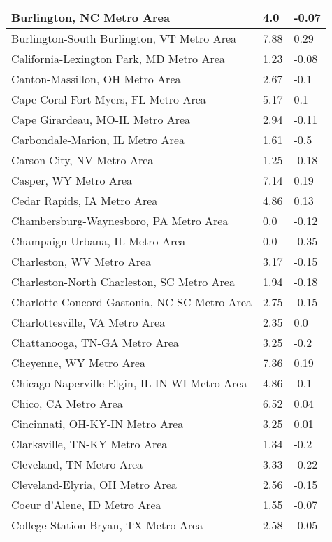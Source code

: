 \documentclass[12pt,oneside, letterpaper]{book}
\begin{document}
\begin{longtable}{| p{} | p{} | p{} |}
    Burlington, NC Metro Area & 4.0 & -0.07 \\ \hline
    Burlington-South Burlington, VT Metro Area & 7.88 & 0.29 \\ \hline
    California-Lexington Park, MD Metro Area & 1.23 & -0.08 \\ \hline
    Canton-Massillon, OH Metro Area & 2.67 & -0.1 \\ \hline
    Cape Coral-Fort Myers, FL Metro Area & 5.17 & 0.1 \\ \hline
    Cape Girardeau, MO-IL Metro Area & 2.94 & -0.11 \\ \hline
    Carbondale-Marion, IL Metro Area & 1.61 & -0.5 \\ \hline
    Carson City, NV Metro Area & 1.25 & -0.18 \\ \hline
    Casper, WY Metro Area & 7.14 & 0.19 \\ \hline
    Cedar Rapids, IA Metro Area & 4.86 & 0.13 \\ \hline
    Chambersburg-Waynesboro, PA Metro Area & 0.0 & -0.12 \\ \hline
    Champaign-Urbana, IL Metro Area & 0.0 & -0.35 \\ \hline
    Charleston, WV Metro Area & 3.17 & -0.15 \\ \hline
    Charleston-North Charleston, SC Metro Area & 1.94 & -0.18 \\ \hline
    Charlotte-Concord-Gastonia, NC-SC Metro Area & 2.75 & -0.15 \\ \hline
    Charlottesville, VA Metro Area & 2.35 & 0.0 \\ \hline
    Chattanooga, TN-GA Metro Area & 3.25 & -0.2 \\ \hline
    Cheyenne, WY Metro Area & 7.36 & 0.19 \\ \hline
    Chicago-Naperville-Elgin, IL-IN-WI Metro Area & 4.86 & -0.1 \\ \hline
    Chico, CA Metro Area & 6.52 & 0.04 \\ \hline
    Cincinnati, OH-KY-IN Metro Area & 3.25 & 0.01 \\ \hline
    Clarksville, TN-KY Metro Area & 1.34 & -0.2 \\ \hline
    Cleveland, TN Metro Area & 3.33 & -0.22 \\ \hline
    Cleveland-Elyria, OH Metro Area & 2.56 & -0.15 \\ \hline
    Coeur d'Alene, ID Metro Area & 1.55 & -0.07 \\ \hline
    College Station-Bryan, TX Metro Area & 2.58 & -0.05 \\ \hline

\end{longtable}
\end{document}
